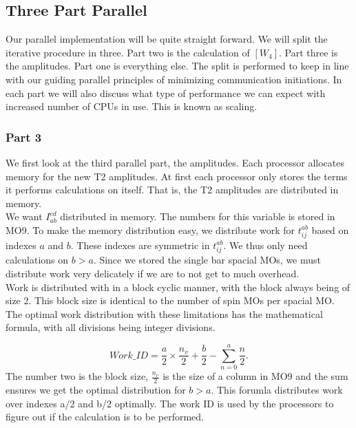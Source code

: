\subsection{Three Part Parallel}
Our parallel implementation will be quite straight forward. We will split the iterative procedure in three. Part two is the calculation of $[W_4]$. Part three is the amplitudes. Part one is everything else. The split is performed to keep in line with our guiding parallel principles of minimizing communication initiations. In each part we will also discuss what type of performance we can expect with increased number of CPUs in use. This is known as scaling. \\

\subsubsection{Part 3}
We first look at the third parallel part, the amplitudes. Each processor allocates memory for the new T2 amplitudes. At first each processor only stores the terms it performs calculations on itself. That is, the T2 amplitudes are distributed in memory. \\

We want $I_{ab}^{cd}$ distributed in memory. The numbers for this variable is stored in MO9. To make the memory distribution easy, we distribute work for $t_{ij}^{ab}$ based on indexes $a$ and $b$. These indexes are symmetric in $t_{ij}^{ab}$. We thus only need calculations on $b > a$. Since we stored the single bar spacial MOs, we must distribute work very delicately if we are to not get to much overhead. \\

Work is distributed with in a block cyclic manner, with the block always being of size 2. This block size is identical to the number of spin MOs per spacial MO. The optimal work distribution with these limitations has the mathematical formula, with all divisions being integer divisions.

\begin{equation}
Work\_ID = \frac{a}{2} \times \frac{n_v}{2} + \frac{b}{2} - \sum_{n=0}^a \frac{n}{2} .
\end{equation}
The number two is the block size, $\frac{n_v}{2}$ is the size of a column in MO9 and the sum ensures we get the optimal distribution for $b > a$. This forumla distributes work over indexes a/2 and b/2 optimally. The work ID is used by the processors to figure out if the calculation is to be performed.

